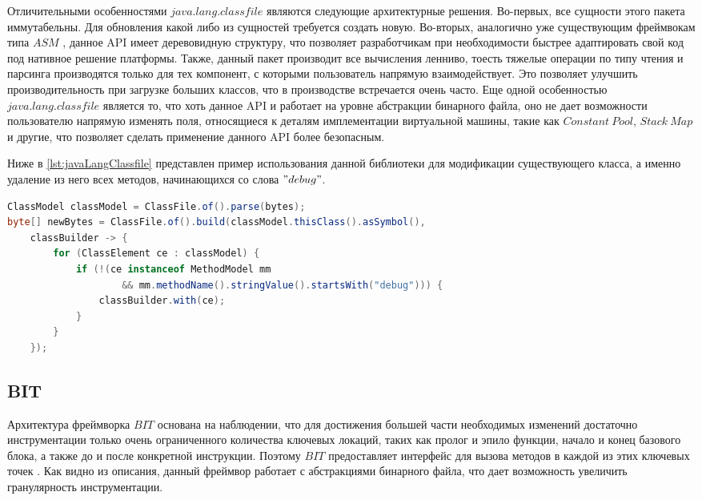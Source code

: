 Отличительными особенностями $java.lang.classfile$ являются следующие архитектурные решения. Во-первых, все сущности этого пакета иммутабельны. Для обновления какой либо из сущностей требуется создать новую. Во-вторых, аналогично уже существующим фреймвокам типа $ASM$ \cite{asm}, данное API имеет деревовидную структуру, что позволяет разработчикам при необходимости быстрее адаптировать свой код под нативное решение платформы. Также, данный пакет производит все вычисления ленниво, тоесть тяжелые операции по типу чтения и парсинга производятся только для тех компонент, с которыми пользователь напрямую взаимодействует. Это позволяет улучшить производительность при загрузке больших классов, что в производстве встречается очень часто. Еще одной особенностью $java.lang.classfile$ является то, что хоть данное API и работает на уровне абстракции бинарного файла, оно не дает возможности пользователю напрямую изменять поля, относящиеся к деталям имплементации виртуальной машины, такие как $Constant~Pool$, $Stack~Map$ и другие, что позволяет сделать применение данного API более безопасным.

Ниже в \autoref{lst:javaLangClassfile} представлен пример использования данной библиотеки для модификации существующего класса, а именно удаление из него всех методов, начинающихся со слова $"debug"$.

\begin{lstlisting}[language=Java, caption=Удаление методов отладки из класса при помощи библиотеки $java.lang.classfile$, label=lst:javaLangClassfile]
ClassModel classModel = ClassFile.of().parse(bytes);
byte[] newBytes = ClassFile.of().build(classModel.thisClass().asSymbol(),
    classBuilder -> {
        for (ClassElement ce : classModel) {
            if (!(ce instanceof MethodModel mm
                    && mm.methodName().stringValue().startsWith("debug"))) {
                classBuilder.with(ce);
            }
        }
    });
\end{lstlisting}

\subsection{BIT}

Архитектура фреймворка $BIT$ основана на наблюдении, что для достижения большей части необходимых изменений достаточно инструментации только очень ограниченного количества ключевых локаций, таких как пролог и эпило функции, начало и конец базового блока, а также до и после конкретной инструкции. Поэтому $BIT$ предоставляет интерфейс для вызова методов в каждой из этих ключевых точек \cite{bit}. Как видно из описания, данный фреймвор работает с абстракциями бинарного файла, что дает возможность увеличить гранулярность инструментации.

